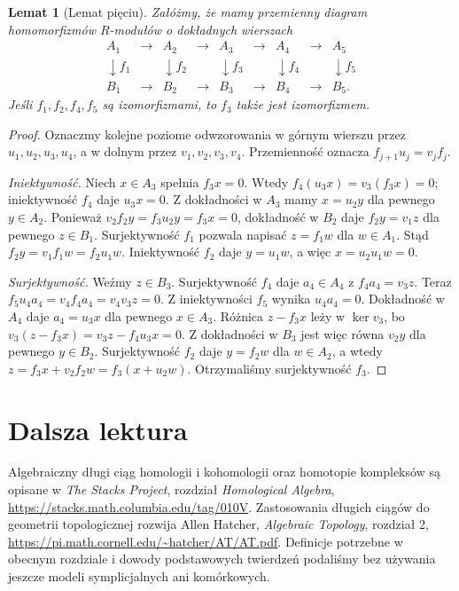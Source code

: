 \documentclass[11pt,a4paper,oneside]{report}
\theoremstyle{plain}
\newtheorem{lemat}[twierdzenie]{Lemat}
\theoremstyle{definition}
\theoremstyle{remark}
\begin{document}
\begin{lemat}[Lemat pięciu]
\label{lem:pieciu}
Załóżmy, że mamy przemienny diagram
homomorfizmów $R$-modułów o dokładnych
wierszach
\[
\begin{array}{ccccccccc}
A_1&\longrightarrow&A_2&\longrightarrow&A_3&
 \longrightarrow&A_4&\longrightarrow&A_5\\
\downarrow f_1&&\downarrow f_2&&\downarrow f_3&&
\downarrow f_4&&\downarrow f_5\\
B_1&\longrightarrow&B_2&\longrightarrow&B_3&
 \longrightarrow&B_4&\longrightarrow&B_5 .
\end{array}
\]
Jeśli $f_1,f_2,f_4,f_5$ są izomorfizmami,
to $f_3$ także jest izomorfizmem.
\end{lemat}
\begin{proof}
Oznaczmy kolejne poziome odwzorowania w górnym
wierszu przez $u_1,u_2,u_3,u_4$,
a w dolnym przez $v_1,v_2,v_3,v_4$.
Przemienność oznacza
$f_{j+1}u_j=v_jf_j$.

\emph{Iniektywność.} Niech $x\in A_3$
spełnia $f_3x=0$.
Wtedy
$f_4(u_3x)=v_3(f_3x)=0$;
iniektywność $f_4$ daje $u_3x=0$.
Z dokładności w $A_3$ mamy
$x=u_2y$ dla pewnego $y\in A_2$.
Ponieważ
$v_2f_2y=f_3u_2y=f_3x=0$,
dokładność w $B_2$ daje
$f_2y=v_1z$ dla pewnego $z\in B_1$.
Surjektywność $f_1$ pozwala napisać
$z=f_1w$ dla $w\in A_1$.
Stąd $f_2y=v_1f_1w=f_2u_1w$.
Iniektywność $f_2$ daje $y=u_1w$,
a więc $x=u_2u_1w=0$.

\emph{Surjektywność.} Weźmy $z\in B_3$.
Surjektywność $f_4$ daje $a_4\in A_4$
z $f_4a_4=v_3z$. Teraz
$f_5u_4a_4=v_4f_4a_4=v_4v_3z=0$.
Z iniektywności $f_5$ wynika
$u_4a_4=0$. Dokładność w $A_4$
daje $a_4=u_3x$ dla pewnego
$x\in A_3$. Różnica
$z-f_3x$ leży w $\ker v_3$,
bo $v_3(z-f_3x)=v_3z-f_4u_3x=0$.
Z dokładności w $B_3$ jest więc
równa $v_2y$ dla pewnego $y\in B_2$.
Surjektywność $f_2$ daje
$y=f_2w$ dla $w\in A_2$, a wtedy
$z=f_3x+v_2f_2w
=f_3(x+u_2w)$.
Otrzymaliśmy surjektywność $f_3$.
\end{proof}

\section*{Dalsza lektura}
Algebraiczny długi ciąg homologii i kohomologii
oraz homotopie kompleksów są opisane w
\emph{The Stacks Project}, rozdział
\emph{Homological Algebra},
\url{https://stacks.math.columbia.edu/tag/010V}.
Zastosowania długich ciągów do geometrii
topologicznej rozwija Allen Hatcher,
\emph{Algebraic Topology}, rozdział 2,
\url{https://pi.math.cornell.edu/~hatcher/AT/AT.pdf}.
Definicje potrzebne w obecnym rozdziale
i dowody podstawowych twierdzeń podaliśmy
bez używania jeszcze modeli
symplicjalnych ani komórkowych.
\clearpage
\end{document}
